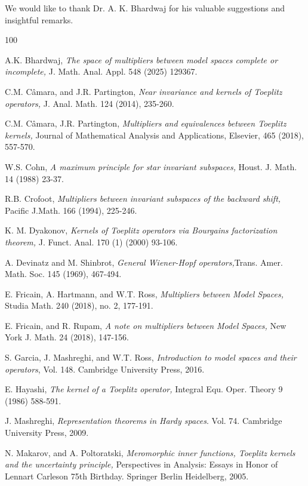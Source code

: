 \documentclass[12pt,a4paper]{amsart}
\begin{document}
We would like to thank Dr. A. K. Bhardwaj for his valuable suggestions and insightful remarks.



\begin{thebibliography}{100}
	

	  A.K. Bhardwaj, {\em The space of multipliers between model spaces complete or incomplete,} J. Math. Anal. Appl. 548 (2025) 129367.

      C.M. C\^amara, and J.R. Partington, {\em Near invariance and kernels of Toeplitz operators,} J. Anal. Math. 124 (2014), 235-260.

      C.M. C\^amara, J.R. Partington, {\em Multipliers and equivalences between Toeplitz kernels,}
     Journal of Mathematical Analysis and Applications, Elsevier, 465 (2018), 557-570.

      W.S. Cohn, {\em A maximum principle for star invariant subspaces,} Houst. J. Math. 14 (1988) 23-37.

      R.B. Crofoot, {\em Multipliers between invariant subspaces of the backward shift,} Pacific J.Math. 166 (1994), 225-246.

      K. M. Dyakonov, {\em Kernels of Toeplitz operators via Bourgains factorization theorem,} J. Funct. Anal. 170 (1) (2000) 93-106.

      A. Devinatz and M. Shinbrot, {\em General Wiener-Hopf operators,}Trans. Amer. Math. Soc. 145 (1969), 467-494.

      E. Fricain, A. Hartmann, and W.T. Ross, {\em Multipliers between Model Spaces,} Studia Math. 240 (2018), no. 2, 177-191.
	
	  E. Fricain, and R. Rupam, {\em A note on multipliers between Model Spaces,} New York J. Math. 24 (2018), 147-156.

      S. Garcia, J. Mashreghi, and W.T. Ross, {\em Introduction to model spaces and their operators}, Vol. 148. Cambridge University Press, 2016.
	
      E. Hayashi, {\em The kernel of a Toeplitz operator,} Integral Equ. Oper. Theory 9 (1986) 588-591.

       J. Mashreghi, {\em Representation theorems in Hardy spaces}. Vol. 74. Cambridge University Press, 2009.

      N. Makarov, and A. Poltoratski, {\em Meromorphic inner functions, Toeplitz kernels and the uncertainty principle,} Perspectives in Analysis: Essays in Honor of Lennart Carleson 75th Birthday. Springer Berlin Heidelberg, 2005.


\end{thebibliography}
\end{document}
